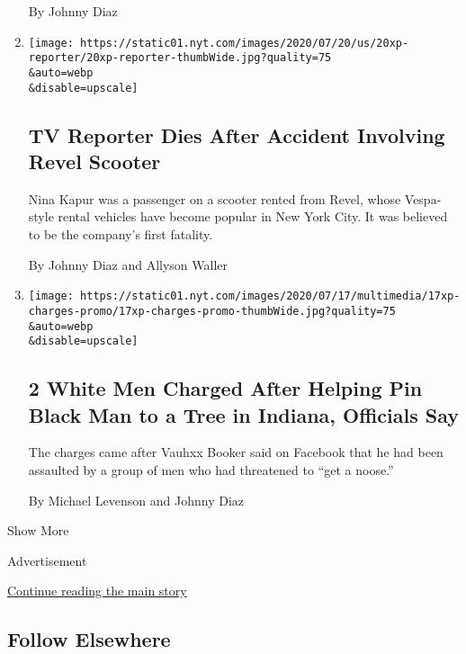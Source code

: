 \begin{enumerate}
  By Johnny Diaz
\item
  \href{/2020/07/20/nyregion/revel-scooter-nina-kapur-dead.html}{}

  \texttt{[image: https://static01.nyt.com/images/2020/07/20/us/20xp-reporter/20xp-reporter-thumbWide.jpg?quality=75\\\&auto=webp\\\&disable=upscale]}

  \hypertarget{tv-reporter-dies-after-accident-involving-revel-scooter}{%
  \subsection{TV Reporter Dies After Accident Involving Revel
  Scooter}\label{tv-reporter-dies-after-accident-involving-revel-scooter}}

  Nina Kapur was a passenger on a scooter rented from Revel, whose
  Vespa-style rental vehicles have become popular in New York City. It
  was believed to be the company's first fatality.

  By Johnny Diaz and Allyson Waller
\item
  \href{/2020/07/17/us/bloomington-indiana-vauhxx-booker.html}{}

  \texttt{[image: https://static01.nyt.com/images/2020/07/17/multimedia/17xp-charges-promo/17xp-charges-promo-thumbWide.jpg?quality=75\\\&auto=webp\\\&disable=upscale]}

  \hypertarget{2-white-men-charged-after-helping-pin-black-man-to-a-tree-in-indiana-officials-say}{%
  \subsection{2 White Men Charged After Helping Pin Black Man to a Tree
  in Indiana, Officials
  Say}\label{2-white-men-charged-after-helping-pin-black-man-to-a-tree-in-indiana-officials-say}}

  The charges came after Vauhxx Booker said on Facebook that he had been
  assaulted by a group of men who had threatened to ``get a noose.''

  By Michael Levenson and Johnny Diaz
\end{enumerate}

Show More

Advertisement

\protect\hyperlink{after-mid2}{Continue reading the main story}

\hypertarget{follow-elsewhere}{%
\subsection{Follow Elsewhere}\label{follow-elsewhere}}

